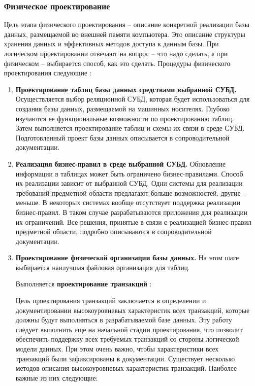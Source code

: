 \subsubsection{Физическое проектирование}

Цель этапа физического проектирования – описание конкретной реализации базы данных, размещаемой во внешней
памяти компьютера. Это описание структуры хранения данных и эффективных методов доступа к данным базы. При
логическом проектировании отвечают на вопрос – что надо сделать, а при физическом – выбирается способ, как
это сделать. Процедуры физического проектирования следующие \autocite{oscerko}:
\begin{enumerate}
    \item \textbf{Проектирование таблиц базы данных средствами выбранной СУБД.}
        Осуществляется выбор реляционной СУБД, которая будет использоваться для создания базы данных,
        размещаемой на машинных носителях. Глубоко изучаются ее функциональные возможности по проектированию
        таблиц. Затем выполняется проектирование таблиц и схемы их связи в среде СУБД. Подготовленный проект
        базы данных описывается в сопроводительной документации.

    \item \textbf{Реализация бизнес-правил в среде выбранной СУБД.}
        Обновление информации в таблицах может быть ограничено бизнес-правилами. Способ их реализации
        зависит от выбранной СУБД. Одни системы для реализации требований предметной области предлагают
        больше возможностей, другие – меньше. В некоторых системах вообще отсутствует поддержка реализации
        бизнес-правил. В таком случае разрабатываются приложения для реализации их ограничений. Все решения,
        принятые в связи с реализацией бизнес-правил предметной области, подробно описываются в сопроводительной
        документации.

    \item \textbf{Проектирование физической организации базы данных.}
        На этом шаге выбирается наилучшая файловая организация для таблиц. 
        
        Выполняется \textbf{проектирование транзакций} \autocite{koch}:
        
        Цель проектирования транзакций заключается в определении и
        документировании высокоуровневых характеристик всех транзакций,
        которые должны будут выполняться в разрабатываемой базе данных. Эту
        работу следует выполнить еще на начальной стадии проектирования, что
        позволит обеспечить поддержку всех требуемых транзакций со стороны
        логической модели данных. При этом очень важно, чтобы характеристики
        всех транзакций были зафиксированы в документации. Существует
        несколько методов описания высокоуровневых характеристик транзакций.
        Наиболее важные из них следующие:
        

\end{enumerate}
